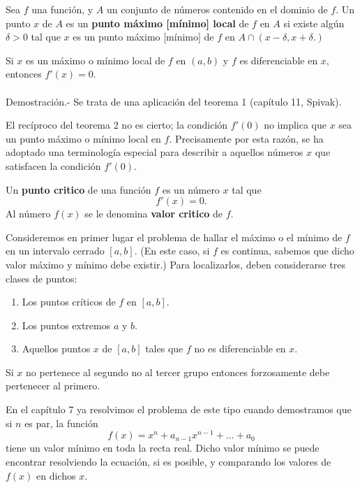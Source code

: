     \begin{def.}
	Sea $f$ una función, y $A$ un conjunto de números contenido en el dominio de $f$. Un punto $x$ de $A$ es un \textbf{punto máximo [mínimo] local} de $f$ en $A$ si existe algún $\delta>0$ tal que $x$ es un punto máximo [mínimo] de $f$ en $A\cap (x-\delta,x+\delta.)$
    \end{def.}

\begin{teo}
    Si $x$ es un máximo o mínimo local de $f$ en $(a,b)$ y $f$ es diferenciable en $x$, entonces $f'(x)=0$.\\\\
	Demostración.-\; Se trata de una aplicación del teorema 1 (capítulo 11, Spivak).
\end{teo}

El recíproco del teorema 2 no es cierto; la condición $f'(0)$ no implica que $x$ sea un punto máximo o mínimo local en $f$. Precisamente por esta razón, se ha adoptado una terminología especial para describir a aquellos números $x$ que satisfacen la condición $f'(0)$.

    \begin{def.}
	Un \textbf{punto critico} de una función $f$ es un número $x$ tal que 
	$$f'(x)=0.$$
	Al número $f(x)$ se le denomina \textbf{valor critico} de $f$.
    \end{def.}

Consideremos en primer lugar el problema de hallar el máximo o el mínimo de $f$ en un intervalo cerrado $[a,b]$. (En este caso, si $f$ es continua, sabemos que dicho valor máximo y mínimo debe existir.) Para localizarlos, deben considerarse tres clases de puntos:

\begin{enumerate}[(1)]
    \item Los puntos críticos de $f$ en $[a,b]$.
    \item Los puntos extremos $a$ y $b$.
    \item Aquellos puntos $x$ de $[a,b]$ tales que $f$ no es diferenciable en $x$.
\end{enumerate}

Si $x$ no pertenece al segundo no al tercer grupo entonces forzosamente debe pertenecer al primero.\\


\begin{obs}
    En el capítulo 7 ya resolvimos el problema de este tipo cuando demostramos que si $n$ es par, la función
    $$f(x)=x^n+a_{n-1}x^{n-1}+\ldots + a_0$$
    tiene un valor mínimo en toda la recta real. Dicho valor mínimo se puede encontrar resolviendo la ecuación, si es posible, y comparando los valores de $f(x)$ en dichos $x$.\\
\end{obs}

